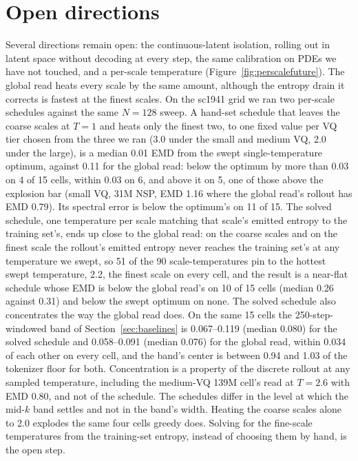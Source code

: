 \documentclass{article}
\begin{document}
\newpage

\appendix

\section{Open directions}
\label{app:future}

Several directions remain open: the continuous-latent isolation, rolling out in latent
space without decoding at every step, the same calibration on PDEs we have not touched,
and a per-scale temperature (Figure~\ref{fig:perscalefuture}). The global read heats
every scale by the same amount, although the entropy drain it corrects is fastest at the
finest scales. On the sc1941 grid we ran
two per-scale schedules against the same $N{=}128$ sweep. A hand-set schedule that leaves
the coarse scales at $T{=}1$ and heats only the finest two, to one fixed value per VQ tier
chosen from the three we ran (3.0 under the small and medium VQ, 2.0 under the large), is
a median 0.01 EMD from the swept single-temperature optimum, against 0.11 for the global
read: below the optimum by more than 0.03 on 4 of 15 cells, within 0.03 on 6, and above it
on 5, one of those above the explosion bar (small VQ, 31M NSP, EMD 1.16 where the global
read's rollout has EMD 0.79). Its spectral error is below the optimum's on 11 of 15. The solved schedule,
one temperature per scale matching that scale's emitted entropy to the training set's,
ends up close to the global read: on the coarse scales and on the finest scale the rollout's emitted
entropy never reaches the training set's at any temperature we swept, so 51 of the 90
scale-temperatures pin to the hottest swept temperature, 2.2, the finest scale on every
cell, and the result is a near-flat schedule whose EMD is below the global read's on 10 of 15
cells (median 0.26 against 0.31) and below the swept optimum on none. The solved schedule
also concentrates the way the global read does. On the same 15 cells the 250-step-windowed
band of Section~\ref{sec:baselines} is 0.067--0.119 (median 0.080) for the solved schedule
and 0.058--0.091 (median 0.076) for the global read, within 0.034 of each other on every
cell, and the band's center is between 0.94 and 1.03 of the tokenizer floor for both.
Concentration is a property of the discrete rollout at any sampled temperature, including
the medium-VQ 139M cell's read at $T{=}2.6$ with EMD 0.80, and not of the schedule. The
schedules differ in the level at which the mid-$k$ band settles and not in the band's width.
Heating the coarse
scales alone to 2.0 explodes the same four cells greedy does. Solving for the fine-scale
temperatures from the training-set entropy, instead of choosing them by hand, is the open
step.
\end{document}

